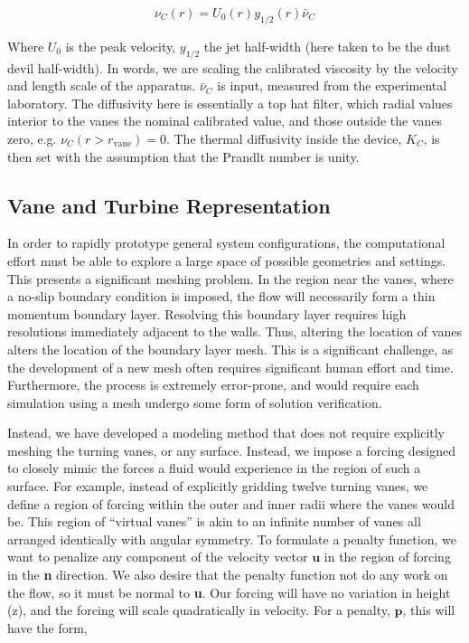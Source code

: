 \begin{equation}
 \nu_C(r) = U_0(r) y_{1/2}(r) \bar \nu_C
\end{equation}

Where $U_0$ is the peak velocity, $y_{1/2}$ the jet half-width (here
taken to be the dust devil half-width). In words, we are scaling the
calibrated viscosity by the velocity and length scale of the
apparatus. $\bar \nu_C $ is input, measured from the experimental
laboratory.  The diffusivity here is essentially a top hat filter, which
radial values interior to the vanes the nominal calibrated value, and
those outside the vanes zero, e.g. $\nu_C(r>r_{\text{vane}})=0$. The
thermal diffusivity inside the device, $K_C$, is then set with the
assumption that the Prandlt number is unity.  

\subsection{Vane and Turbine Representation}

In order to rapidly prototype general system configurations, the
computational effort must be able to explore a large space of possible
geometries and settings. This presents a significant meshing
problem. In the region near the vanes, where a no-slip boundary
condition is imposed, the flow will necessarily form a thin momentum
boundary layer. Resolving this boundary layer requires high resolutions
immediately adjacent to the walls. Thus, altering the location of vanes
alters the location of the boundary layer mesh. This is a significant
challenge, as the development of a new mesh often requires significant
human effort and time. Furthermore, the process is extremely
error-prone, and would require each simulation using a mesh undergo
some form of solution verification. 

Instead, we have developed a modeling method that does not require
explicitly meshing the turning vanes, or any surface. Instead, we impose
a forcing designed to closely mimic the forces a fluid would experience
in the region of such a surface. For example, instead of explicitly
gridding twelve turning vanes, we define a region of forcing within the
outer and inner radii where the vanes would be. This region of ``virtual
vanes'' is akin to an infinite number of vanes all arranged identically
with angular symmetry. To formulate a penalty function, we want to
penalize any component of the velocity vector $\textbf{u}$ in the region
of forcing in the \textbf{n} direction. We also desire that the penalty
function not do any work on the flow, so it must be normal to
\textbf{u}. Our forcing will have no variation in height (z), and the
forcing will scale quadratically in velocity. For a penalty, $\textbf{p}$, this
will have the form,   

